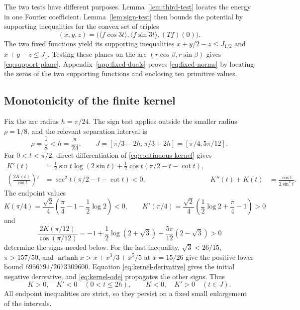 \documentclass[11pt,reqno]{amsart}
\numberwithin{equation}{section}
\theoremstyle{definition}
\theoremstyle{remark}
\newcommand{\ac}[1]{\langle #1\rangle}
\DeclareMathOperator{\arctanh}{artanh}
\begin{document}
The two tests have different purposes. Lemma~\ref{lem:third-test} locates the energy in one Fourier coefficient. Lemma~\ref{lem:sign-test} then bounds the potential by supporting inequalities for the convex set of triples
\[
 (x,y,z)=\bigl(\ac{f\cos3t},\ac{f\sin3t},(Tf)(0)\bigr).
\]
The two fixed functions yield its supporting inequalities $x+y/2-z\le J_{1/2}$ and $x+y-z\le J_1$. Testing these planes on the arc $(r\cos\beta,r\sin\beta)$ gives \eqref{eq:support-plane}. Appendix~\ref{app:fixed-duals} proves \eqref{eq:fixed-norms} by locating the zeros of the two supporting functions and enclosing ten primitive values.

\subsection{Monotonicity of the finite kernel}\label{subsec:kernel-propagation}
Fix the arc radius $h=\pi/24$. The sign test applies outside the smaller radius $\rho=1/8$, and the relevant separation interval is
\[
 \rho=\frac18<h=\frac\pi{24},\qquad
 J=[\pi/3-2h,\pi/3+2h]=[\pi/4,5\pi/12].
\]
For $0<t<\pi/2$, direct differentiation of \eqref{eq:continuous-kernel} gives
\begin{align}
 K'(t)&=\tfrac12\sin t\log(2\sin t)
       +\tfrac12\cos t(\pi/2-t-\cot t),\label{eq:kernel-derivative}\\
 \left(\frac{2K(t)}{\cos t}\right)'&=\sec^2t(\pi/2-t-\cot t)<0,
 &K''(t)+K(t)&=\frac{\cos t}{2\sin^2t}.
 \label{eq:kernel-ode}
\end{align}
The endpoint values
\[
 K(\pi/4)=\frac{\sqrt2}{4}\left(\frac\pi4-1-\frac12\log2\right)<0,
 \qquad
 K'(\pi/4)=\frac{\sqrt2}{4}\left(\frac12\log2+\frac\pi4-1\right)>0
\]
and
\[
 \frac{2K(\pi/12)}{\cos(\pi/12)}
 =-1+\frac12\log(2+\sqrt3)+\frac{5\pi}{12}(2-\sqrt3)>0
\]
determine the signs needed below. For the last inequality, $\sqrt3<26/15$, $\pi>157/50$, and
$\arctanh x>x+x^3/3+x^5/5$ at $x=15/26$ give the positive lower bound $6956791/2673309600$. Equation \eqref{eq:kernel-derivative} gives the initial negative derivative, and \eqref{eq:kernel-ode} propagates the other signs. Thus
\begin{equation}\label{eq:kernel-signs}
 K>0,\quad K'<0\quad(0<t\le2h),\qquad
 K<0,\quad K'>0\quad(t\in J).
\end{equation}
All endpoint inequalities are strict, so they persist on a fixed small enlargement of the intervals.
\end{document}
